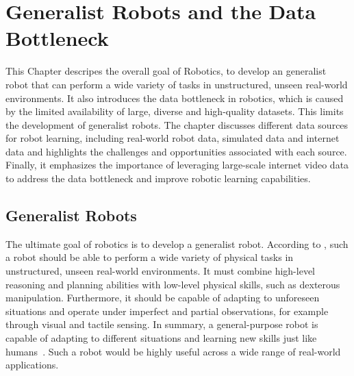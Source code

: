 \chapter{Generalist Robots and the Data Bottleneck}
\label{chap:GeneralistRobotsAndTheDataBottleneck}
\minitoc
This Chapter descripes the overall goal of Robotics, to develop an generalist robot that can perform a wide variety of tasks in unstructured, unseen real-world environments. It also introduces the data bottleneck in robotics, which is caused by the limited availability of large, diverse and high-quality datasets. This limits the development of generalist robots. The chapter discusses different data sources for robot learning, including real-world robot data, simulated data and internet data and highlights the challenges and opportunities associated with each source. Finally, it emphasizes the importance of leveraging large-scale internet video data to address the data bottleneck and improve robotic learning capabilities.


\section{Generalist Robots}
The ultimate goal of robotics is to develop a generalist robot. According to \textcite{McCarthy_2025}, such a robot should be able to perform a wide variety of physical tasks in unstructured, unseen real-world environments. It must combine high-level reasoning and planning abilities with low-level physical skills, such as dexterous manipulation. Furthermore, it should be capable of adapting to unforeseen situations and operate under imperfect and partial observations, for example through visual and tactile sensing. In summary, a general-purpose robot is capable of adapting to different situations and learning new skills just like humans~\cite{tsujiSurveyImitationLearning2026}. Such a robot would be highly useful across a wide range of real-world applications. 

